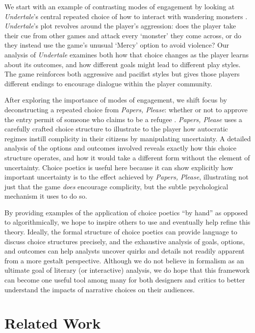 \documentclass[arts,article,submit,moreauthors,pdftex,10pt,a4paper]{Definitions/mdpi}
\begin{document}
We start with an example of contrasting modes of engagement by looking at \emph{Undertale}'s central repeated choice of how to interact with wandering monsters \citep{fox2015undertale}.
%
\emph{Undertale}'s plot revolves around the player's aggression: does the player take their cue from other games and attack every `monster' they come across, or do they instead use the game's unusual `Mercy' option to avoid violence?
%
Our analysis of \emph{Undertale} examines both how that choice changes as the player learns about its outcomes, and how different goals might lead to different play styles.
%
The game reinforces both aggressive and pacifist styles but gives those players different endings to encourage dialogue within the player community.


After exploring the importance of modes of engagement, we shift focus by deconstructing a repeated choice from \emph{Papers, Please}: whether or not to approve the entry permit of someone who claims to be a refugee \citep{pope2013papers}.
%
\emph{Papers, Please} uses a carefully crafted choice structure to illustrate to the player how autocratic regimes instill complicity in their citizens by manipulating uncertainty.
%
A detailed analysis of the options and outcomes involved reveals exactly how this choice structure operates, and how it would take a different form without the element of uncertainty.
%
Choice poetics is useful here because it can show explicitly how important uncertainty is to the effect achieved by \emph{Papers, Please}, illustrating not just that the game \emph{does} encourage complicity, but the subtle psychological mechanism it uses to do so.


By providing examples of the application of choice poetics ``by hand'' as opposed to algorithmically, we hope to inspire others to use and eventually help refine this theory.
%
Ideally, the formal structure of choice poetics can provide language to discuss choice structures precisely, and the exhaustive analysis of goals, options, and outcomes can help analysts uncover quirks and details not readily apparent from a more gestalt perspective.
%
Although we do not believe in formalism as an ultimate goal of literary (or interactive) analysis, we do hope that this framework can become one useful tool among many for both designers and critics to better understand the impacts of narrative choices on their audiences.

\section{Related Work}
\end{document}
